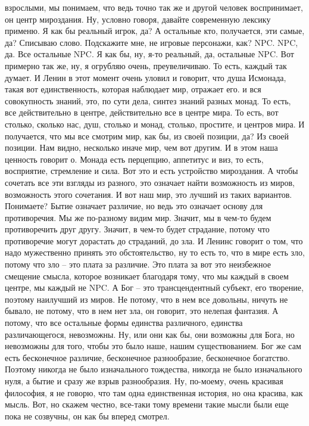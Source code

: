 взрослыми, мы понимаем, что ведь точно так же и другой человек воспринимает, он
центр мироздания. Ну, условно говоря, давайте современную лексику применю. Я как
бы реальный игрок, да? А остальные кто, получается, эти самые, да? Списываю
слово. Подскажите мне, не игровые персонажи, как? NPC. NPC, да. Все остальные
NPC. Я как бы, ну, я-то реальный, да, остальные NPC. Вот примерно так же, ну, я
огрубляю очень, преувеличиваю. То есть, каждый так думает. И Ленин в этот момент
очень уловил и говорит, что душа Исмонада, такая вот единственность, которая
наблюдает мир, отражает его. и вся совокупность знаний, это, по сути дела,
синтез знаний разных монад. То есть, все действительно в центре, действительно
все в центре мира. То есть, вот столько, сколько нас, душ, столько и монад,
столько, простите, и центров мира. И получается, что мы все смотрим мир, как бы,
из своей позиции, да? Из своей позиции. Нам видно, несколько иначе мир, чем вот
другим. И в этом наша ценность говорит о. Монада есть перцепцию, аппетитус и
виз, то есть, восприятие, стремление и сила. Вот это и есть устройство
мироздания. А чтобы сочетать все эти взгляды из разного, это означает найти
возможность из миров, возможность этого сочетания. И вот наш мир, это лучший из
таких вариантов. Понимаете? Бытие означает различие, но ведь это означает основу
для противоречия. Мы же по-разному видим мир. Значит, мы в чем-то будем
противоречить друг другу. Значит, в чем-то будет страдание, потому что
противоречие могут дорастать до страданий, до зла. И Ленинс говорит о том, что
надо мужественно принять это обстоятельство, ну то есть то, что в мире есть зло,
потому что зло – это плата за различие. Это плата за вот это неизбежное смещение
смысла, которое возникает благодаря тому, что мы каждый в своем центре, мы
каждый не NPC. А Бог – это трансцендентный субъект, его творение, поэтому
наилучший из миров. Не потому, что в нем все довольны, ничуть не бывало, не
потому, что в нем нет зла, он говорит, это нелепая фантазия. А потому, что все
остальные формы единства различного, единства различающегося, невозможны. Ну,
или они как бы, они возможны для Бога, но невозможны для того, чтобы это было
наше, нашим существованием. Бог же сам есть бесконечное различие, бесконечное
разнообразие, бесконечное богатство. Поэтому никогда не было изначального
тождества, никогда не было изначального нуля, а бытие и сразу же взрыв
разнообразия. Ну, по-моему, очень красивая философия, я не говорю, что там одна
единственная история, но она красива, как мысль. Вот, но скажем честно, все-таки
тому времени такие мысли были еще пока не созвучны, он как бы вперед смотрел.

